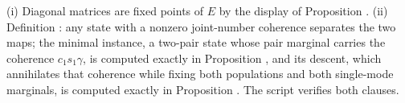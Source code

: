 (i) Diagonal matrices are fixed points of $E$ by the display of Proposition . (ii) Definition : any state with a nonzero joint-number coherence separates the two maps; the minimal instance, a two-pair state whose pair marginal carries the coherence $c_1 s_1 \gamma$, is computed exactly in Proposition , and its descent, which annihilates that coherence while fixing both populations and both single-mode marginals, is computed exactly in Proposition . The script verifies both clauses.
